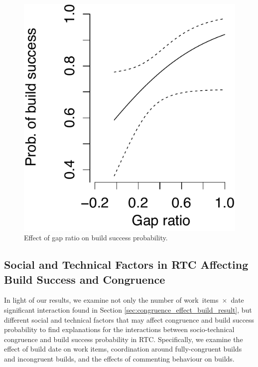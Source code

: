 \begin{figure}[t]
	\centering
	\includegraphics[width=.5\columnwidth]{figures/prob_gapsize_g1}
	\caption{Effect of gap ratio on build success probability. }
	\label{fig:prob_gapsize_a}
\end{figure}




\subsection{Social and Technical Factors in RTC Affecting Build Success and Congruence}
\label{sec:otherfactors}
In light of our results, we examine not only the number of work~items~$\times$~date significant interaction found in Section \ref{sec:congruence_effect_build_result}, but different social and technical factors that may affect congruence
and build success probability to find explanations for the interactions between socio-technical congruence and build success probability in RTC.
Specifically, we examine the effect of build date on work items, coordination around fully-congruent builds and
incongruent builds, and the effects of commenting behaviour on builds.

